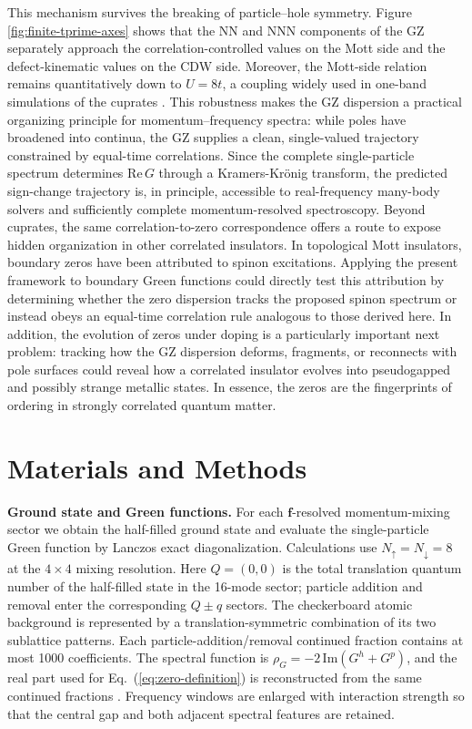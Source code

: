 \documentclass[aps,prl,reprint,superscriptaddress,nofootinbib,longbibliography]{revtex4-1}
\newcommand{\ReG}{\mathrm{Re}\,G}
\newcommand{\rhoG}{\rho_G}
\newcommand{\disp}[1]{Eq.~(\ref{#1})}
\newcommand{\Figdisp}[1]{Figure \ref{#1}}
\begin{document}
This mechanism survives the breaking of particle--hole symmetry. \Figdisp{fig:finite-tprime-axes} shows that the NN and NNN components of the GZ separately approach the correlation-controlled values on the Mott side and the defect-kinematic values on the CDW side. Moreover, the Mott-side relation remains quantitatively down to $U=8t$, a coupling widely used in one-band simulations of the cuprates \cite{zheng2017stripe,qin2022computational}. This robustness makes the GZ dispersion a practical organizing principle for momentum--frequency spectra: while poles have broadened into continua, the GZ supplies a clean, single-valued trajectory constrained by equal-time correlations. Since the complete single-particle spectrum determines $\ReG$ through a Kramers-Kr\"onig transform, the predicted sign-change trajectory is, in principle, accessible to real-frequency many-body solvers and sufficiently complete momentum-resolved spectroscopy. Beyond cuprates, the same correlation-to-zero correspondence offers a route to expose hidden organization in other correlated insulators. In topological Mott insulators, boundary zeros have been attributed to spinon excitations\cite{milliszeros}. Applying the present framework to boundary Green functions could directly test this attribution by determining whether the zero dispersion tracks the proposed spinon spectrum or instead obeys an equal-time correlation rule analogous to those derived here. In addition, the evolution of zeros under doping is a particularly important next problem: tracking how the GZ dispersion deforms, fragments, or reconnects with pole surfaces could reveal how a correlated insulator evolves into pseudogapped and possibly strange metallic states.  In essence, the zeros are the fingerprints of ordering in strongly correlated quantum matter.

\section{Materials and Methods}
\textbf{Ground state and Green functions.} For each $\mathbf f$-resolved momentum-mixing sector we obtain the half-filled ground state and evaluate the single-particle Green function by Lanczos exact diagonalization. Calculations use $N_\uparrow=N_\downarrow=8$ at the $4\times4$ mixing resolution. Here $Q=(0,0)$ is the total translation quantum number of the half-filled state in the 16-mode sector; particle addition and removal enter the corresponding $Q\pm q$ sectors. The checkerboard atomic background is represented by a translation-symmetric combination of its two sublattice patterns. Each particle-addition/removal continued fraction contains at most 1000 coefficients. The spectral function is $\rhoG=-2\,\mathrm{Im}(G^h+G^p)$, and the real part used for \disp{eq:zero-definition} is reconstructed from the same continued fractions \cite{gagliano1987dynamical}. Frequency windows are enlarged with interaction strength so that the central gap and both adjacent spectral features are retained.
\end{document}
